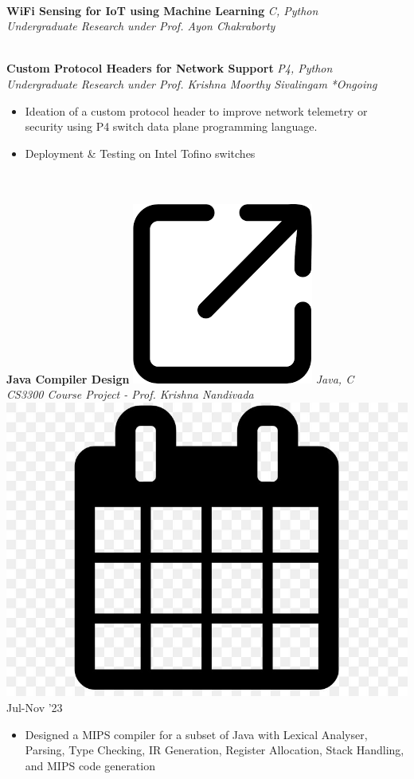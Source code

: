 \documentclass[article]{article}
\newcommand{\myMargin}{0.15in}
\newcommand{\resheading}[1]{{\small \colorbox{myblue} { \begin{minipage}{\dimexpr\linewidth-2\fboxsep}\centering{\textbf{#1 \vphantom{p\^{E}}}}\end{minipage}}}}
\newcommand{\myfont}[2]{\fontsize{#1}{#1}\selectfont #2}
\newcommand{\subheadingfont}[1]{\myfont{10pt}{#1}}
\newcommand{\projecttopic}[1]{\myfont{10pt}{\textbf{#1}}}
\newcommand{\projectdesc}[1]{\myfont{9pt}{\textcolor{projDescColor}{\textit{#1}}}}
\newcommand{\mylink}[1]{\href{#1}{\includegraphics[scale=0.03]{download.png}}}
\newcommand{\mycal}[1]{\includegraphics[scale=0.018]{calendar.png} \myfont{9}{#1}}
\begin{document}
\begin{multicols*}{2}
\noindent
\hrulefill \\ [-0.45cm]
\projecttopic{WiFi Sensing for IoT using Machine Learning} \hfill \textcolor{projDescColor}{\textit{C, Python}} \\ [0.1cm]
\projectdesc{Undergraduate Research under Prof. Ayon Chakraborty}
\vspace{3pt} 
\noindent
\hrulefill \\ [-0.45cm]
\projecttopic{Custom Protocol Headers for Network Support}   \hfill \textcolor{projDescColor}{\textit{P4, Python}}\\[0.1cm]
\projectdesc{Undergraduate Research under Prof. Krishna Moorthy Sivalingam} \hfill \textit{*Ongoing}
\vspace{1pt}
\begin{itemize}[leftmargin=\myMargin]
    \setlength \itemsep{-0.1em}
    \item Ideation of a custom protocol header to improve network telemetry or security using P4 switch data plane programming language.
    \item Deployment \& Testing on Intel Tofino switches  
\end{itemize}
\vspace{3pt}

\noindent
\resheading{\subheadingfont{PROJECTS} }\\[0.1cm]

\noindent
\hrulefill \\ [-0.45cm]
\projecttopic{Java Compiler Design}
\mylink{https://github.com/Snehadeep-Gayen/Compiler-Design-HW}
\hfill    \textcolor{projDescColor}{\textit{Java, C}}  \\[0.05cm]
\projectdesc{CS3300 Course Project - Prof. Krishna Nandivada} \hfill \mycal{Jul-Nov '23} \\
\noindent
\vspace{-0.4cm}
\begin{itemize}[leftmargin=\myMargin]
    \item Designed a MIPS compiler for a subset of Java with Lexical Analyser, Parsing, Type Checking, IR Generation, Register Allocation, Stack Handling, and MIPS code generation
\end{itemize}
\vspace{5pt}


\end{multicols*}
\end{document}

